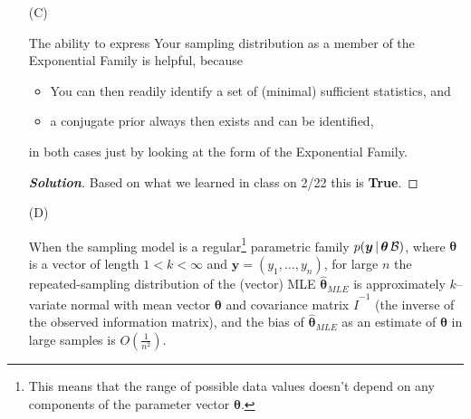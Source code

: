 \documentclass[12pt]{article}
\newcommand{\given}{\, | \,}
\newenvironment{solution}{\begin{tcolorbox}[breakable]\begin{proof}[\textbf{\textit{Solution}}] }{\end{proof}\end{tcolorbox}}
\begin{document}
\begin{itemize}
\begin{solution}
     Now consider if $n = 5$ a relatively small sample size. This means that for each sample the mean of that sample can only be,
     \[0, \ 0.2, \ 0.4, \ 0.6,\ 0.8, \ 1.0\]
     implying then that if we take more repeated samples (increasing M), the long run distribution of these means will never get any closer to the normal curve no matter how large M gets as $(N,n)$ remain fixed. It will just get closer to the true PMF for $\bar{Y}_n$ given the population proportions of 1's and 0's. With small $n$ this will be a spike plot with $(n+1)$ spikes. 

     By the Central Limit Theorem, as long as the population standard deviation remains positive and finite, as $n$ increase the PMF or PDF for $\bar{Y}_n$ will approach normality. 

     In order to actually see what is going on though, we need $n$ and $M$ to increase in the diagram for the CLT to emerge. This is what makes this statement \textbf{True}.

 \end{solution}

\item[(C)]

The ability to express Your sampling distribution as a member of the
Exponential Family is helpful, because

\begin{itemize}

\item

You can then readily identify a set of (minimal) sufficient statistics, and

\item

a conjugate prior always then exists and can be identified, 

\end{itemize}

in both cases just by looking at the form of the Exponential Family. 

\begin{solution}
    Based on what we learned in class on 2/22 this is \textbf{True}. 
\end{solution}

\item[(D)]

When the sampling model is a regular\footnote{This means that the range of possible data values doesn't depend on any components of the parameter vector $\bm{ \theta }$.} parametric family $p ( \bm{ y } \given \bm{ \theta } \, { \cal B } )$, where $\bm{ \theta }$ is a vector of length $1 < k < \infty$ and $\bm{ y } = ( y_1, \dots, y_n )$, for large $n$ the repeated-sampling distribution of the (vector) MLE $\hat{ \bm{ \theta } }_{ MLE }$ is approximately $k$--variate normal with mean vector $\bm{ \theta }$ and covariance matrix $\hat{ I }^{ -1 }$ (the inverse of the observed information matrix), and the bias of $\hat{ \bm{ \theta } }_{ MLE }$ as an estimate of $\bm{ \theta }$ in large samples is $O \! \left( \frac{ 1 }{ n^2 } \right)$. 


\end{itemize}
\end{document}
